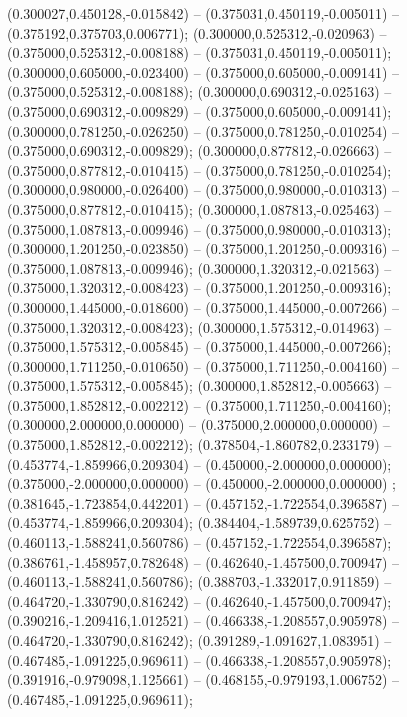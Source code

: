  (0.300027,0.450128,-0.015842) -- (0.375031,0.450119,-0.005011) -- (0.375192,0.375703,0.006771);
 (0.300000,0.525312,-0.020963) -- (0.375000,0.525312,-0.008188) -- (0.375031,0.450119,-0.005011);
 (0.300000,0.605000,-0.023400) -- (0.375000,0.605000,-0.009141) -- (0.375000,0.525312,-0.008188);
 (0.300000,0.690312,-0.025163) -- (0.375000,0.690312,-0.009829) -- (0.375000,0.605000,-0.009141);
 (0.300000,0.781250,-0.026250) -- (0.375000,0.781250,-0.010254) -- (0.375000,0.690312,-0.009829);
 (0.300000,0.877812,-0.026663) -- (0.375000,0.877812,-0.010415) -- (0.375000,0.781250,-0.010254);
 (0.300000,0.980000,-0.026400) -- (0.375000,0.980000,-0.010313) -- (0.375000,0.877812,-0.010415);
 (0.300000,1.087813,-0.025463) -- (0.375000,1.087813,-0.009946) -- (0.375000,0.980000,-0.010313);
 (0.300000,1.201250,-0.023850) -- (0.375000,1.201250,-0.009316) -- (0.375000,1.087813,-0.009946);
 (0.300000,1.320312,-0.021563) -- (0.375000,1.320312,-0.008423) -- (0.375000,1.201250,-0.009316);
 (0.300000,1.445000,-0.018600) -- (0.375000,1.445000,-0.007266) -- (0.375000,1.320312,-0.008423);
 (0.300000,1.575312,-0.014963) -- (0.375000,1.575312,-0.005845) -- (0.375000,1.445000,-0.007266);
 (0.300000,1.711250,-0.010650) -- (0.375000,1.711250,-0.004160) -- (0.375000,1.575312,-0.005845);
 (0.300000,1.852812,-0.005663) -- (0.375000,1.852812,-0.002212) -- (0.375000,1.711250,-0.004160);
 (0.300000,2.000000,0.000000) -- (0.375000,2.000000,0.000000) -- (0.375000,1.852812,-0.002212);
 (0.378504,-1.860782,0.233179) -- (0.453774,-1.859966,0.209304) -- (0.450000,-2.000000,0.000000);
 (0.375000,-2.000000,0.000000) -- (0.450000,-2.000000,0.000000) ;
 (0.381645,-1.723854,0.442201) -- (0.457152,-1.722554,0.396587) -- (0.453774,-1.859966,0.209304);
 (0.384404,-1.589739,0.625752) -- (0.460113,-1.588241,0.560786) -- (0.457152,-1.722554,0.396587);
 (0.386761,-1.458957,0.782648) -- (0.462640,-1.457500,0.700947) -- (0.460113,-1.588241,0.560786);
 (0.388703,-1.332017,0.911859) -- (0.464720,-1.330790,0.816242) -- (0.462640,-1.457500,0.700947);
 (0.390216,-1.209416,1.012521) -- (0.466338,-1.208557,0.905978) -- (0.464720,-1.330790,0.816242);
 (0.391289,-1.091627,1.083951) -- (0.467485,-1.091225,0.969611) -- (0.466338,-1.208557,0.905978);
 (0.391916,-0.979098,1.125661) -- (0.468155,-0.979193,1.006752) -- (0.467485,-1.091225,0.969611);
